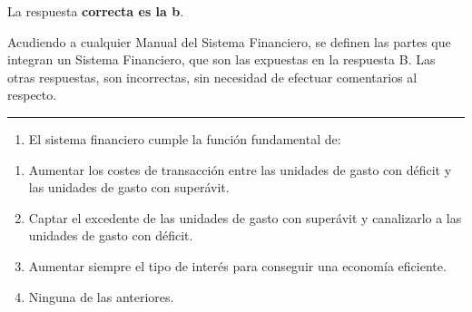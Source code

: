 \documentclass[
  letterpaper,
  DIV=11,
  numbers=noendperiod]{scrreprt}
\providecommand{\tightlist}{%
  \setlength{\itemsep}{0pt}\setlength{\parskip}{0pt}}\usepackage{longtable,booktabs,array}
\begin{document}
\begin{tcolorbox}[enhanced jigsaw, left=2mm, opacityback=0, colback=white, breakable, arc=.35mm, bottomrule=.15mm, rightrule=.15mm, toprule=.15mm, leftrule=.75mm, colframe=quarto-callout-tip-color-frame]
\begin{minipage}[t]{5.5mm}
\textcolor{quarto-callout-tip-color}{\faLightbulb}
\end{minipage}%
\begin{minipage}[t]{\textwidth - 5.5mm}

La respuesta \textbf{correcta es la b}.

Acudiendo a cualquier Manual del Sistema Financiero, se definen las
partes que integran un Sistema Financiero, que son las expuestas en la
respuesta B. Las otras respuestas, son incorrectas, sin necesidad de
efectuar comentarios al respecto.

\end{minipage}%
\end{tcolorbox}

\begin{center}\rule{0.5\linewidth}{0.5pt}\end{center}

\begin{enumerate}
\def\labelenumi{\arabic{enumi}.}
\setcounter{enumi}{23}
\tightlist
\item
  El sistema financiero cumple la función fundamental de:
\end{enumerate}

\begin{enumerate}
\def\labelenumi{\alph{enumi})}
\item
  Aumentar los costes de transacción entre las unidades de gasto con
  déficit y las unidades de gasto con superávit.
\item
  Captar el excedente de las unidades de gasto con superávit y
  canalizarlo a las unidades de gasto con déficit.
\item
  Aumentar siempre el tipo de interés para conseguir una economía
  eficiente.
\item
  Ninguna de las anteriores.
\end{enumerate}
\end{document}
